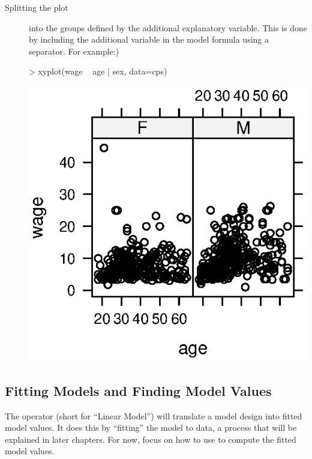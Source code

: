 \begin{description}
\item[Splitting the plot] into the groups defined by the additional
  explanatory variable.  This is done by including the additional
  variable in the model formula using a \code{|} separator.  For
  example:)
\begin{Schunk}
\begin{Sinput}
> xyplot(wage ~ age | sex, data=cps)
\end{Sinput}
\end{Schunk}
\includegraphics{Figures/language-scatter3}

\end{description}



\subsection{Fitting Models and Finding Model Values}

The  operator (short for ``Linear Model'') will translate a
model design into fitted model values. 
It does this by ``fitting''
the model to data, a process that will be explained in later
chapters.  For now, focus on how to use  to compute the
fitted model values.

